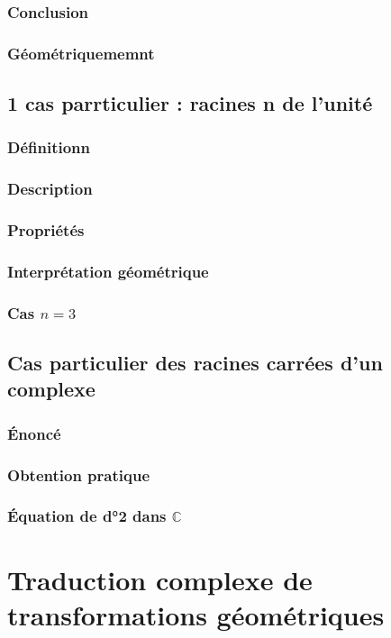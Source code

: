 \documentclass[12pt,a4paper,french]{book}
\begin{document}
			\subsubsection{Conclusion}
			\subsubsection{Géométriquememnt}
		\subsection{1 cas parrticulier : racines n de l'unité}
			\subsubsection{Définitionn}
			\subsubsection{Description}
			\subsubsection{Propriétés}
			\subsubsection{Interprétation géométrique}
			\subsubsection{Cas $n=3$}
		\subsection{Cas particulier des racines carrées d'un complexe}
			\subsubsection{Énoncé}
			\subsubsection{Obtention pratique}
			\subsubsection{Équation de d°2 dans $\mathbb{C}$}
	\section{Traduction complexe de transformations géométriques}
\end{document}
